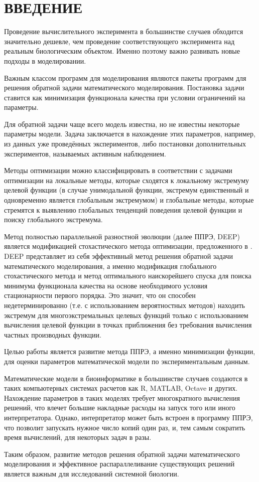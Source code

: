 \chapter*{ВВЕДЕНИЕ}

Проведение вычислительного эксперимента
в большинстве случаев обходится значительно дешевле,
чем проведение соответствующего эксперимента
над реальным биологическим объектом.
Именно поэтому важно развивать новые подходы в моделировании.

Важным классом программ для моделирования
являются пакеты программ
для решения обратной задачи математического моделирования.
Постановка задачи ставится
как минимизация функционала качества
при условии ограничений на параметры.

Для обратной задачи чаще всего модель известна,
но не известны некоторые параметры модели.
Задача заключается в нахождение этих параметров,
например, из данных уже проведённых экспериментов,
либо постановки дополнительных экспериментов,
называемых активным наблюдением.

Методы оптимизации можно классифицировать в соответствии с задачами оптимизации на локальные методы, которые сходятся к локальному экстремуму целевой функции (в случае унимодальной функции, экстремум единственный и одновременно является глобальным экстремумом) и глобальные методы, которые стремятся к выявлению глобальных тенденций поведения целевой функции и поиску глобального экстремума.

Метод полностью параллельной разностной эволюции
(далее ППРЭ, DEEP) \cite{Kozlov11, Kozlov13}
является модификацией стохастического метода оптимизации,
предложенного в \cite{Storn95}.
DEEP представляет из себя эффективный метод решения обратной задачи математического моделирования, а именно модификация глобального стохастического метода и метод оптимального наискорейшего спуска для поиска минимума функционала качества на основе необходимого условия стационарности первого порядка.
Это значит, что он способен недетерминированно (т.е. с использованием вероятностных методов) находить экстремум для многоэкстремальных целевых функций только с использованием вычисления целевой функции в точках приближения без требования вычисления частных производных функции.

Целью работы является развитие метода ППРЭ, а именно минимизации функции, для оценки параметров математической модели по экспериментальным данным.

Математические модели в биоинформатике в большинстве случаев создаются в таких компьютерных системах расчетов как R, MATLAB, Octave и других.
Нахождение параметров в таких моделях требует многократного вычисления решений, что влечет большие накладные расходы на запуск того или иного интерпретатора.
Однако, интерпретатор может быть встроен в программу ППРЭ, что позволит запускать нужное число копий один раз, и, тем самым сократить время вычислений, для некоторых задач в разы.

Таким образом, развитие методов решения обратной задачи математического моделирования и эффективное распараллеливание существующих решений является важным для исследований системной биологии.

